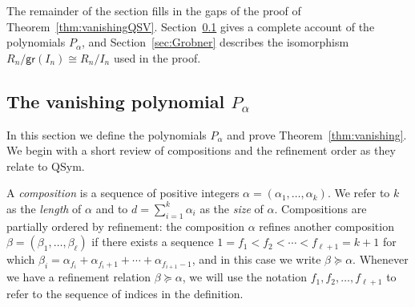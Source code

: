 \documentclass[12pt]{amsart}
\theoremstyle{definition}
\theoremstyle{remark}
\newtheorem{rem}[equation]{Remark}
\numberwithin{equation}{section}
\newcommand{\QSym}{\mathrm{QSym}}
\begin{document}

The remainder of the section fills in the gaps of the proof of Theorem~\ref{thm:vanishingQSV}.  Section~\ref{sec:QSymvanish} gives a complete account of the polynomials $P_{\alpha}$, and Section~\ref{sec:Grobner} describes the isomorphism $R_{n}\big/\mathsf{gr}(I_{n}) \cong R_{n}\big/I_{n}$ used in the proof.


\subsection{The vanishing polynomial $P_{\alpha}$}
\label{sec:QSymvanish}

In this section we define the polynomials $P_{\alpha}$ and prove Theorem~\ref{thm:vanishing}.  We begin with a short review of compositions and the refinement order as they relate to $\QSym$.  

A \emph{composition} is a sequence of positive integers $\alpha = (\alpha_{1}, \ldots, \alpha_{k})$.  We refer to $k$ as the \emph{length} of $\alpha$ and to $d = \sum_{i = 1}^{k} \alpha_{i}$ as the \emph{size} of $\alpha$.  Compositions are partially ordered by refinement: the composition $\alpha$ refines another composition $\beta = (\beta_{1}, \ldots, \beta_{\ell})$ if there exists a sequence $1 = f_{1} < f_{2} < \cdots < f_{\ell + 1} = k+1$ for which $\beta_{i} = \alpha_{f_{i}} + \alpha_{f_{i} + 1} + \cdots + \alpha_{f_{i+1} - 1}$, and in this case we write $\beta \succeq \alpha$.  Whenever we have a refinement relation $\beta \succeq \alpha$, we will use the notation $f_{1}, f_{2}, \ldots, f_{\ell+1}$ to refer to the sequence of indices in the definition.
\end{document}
